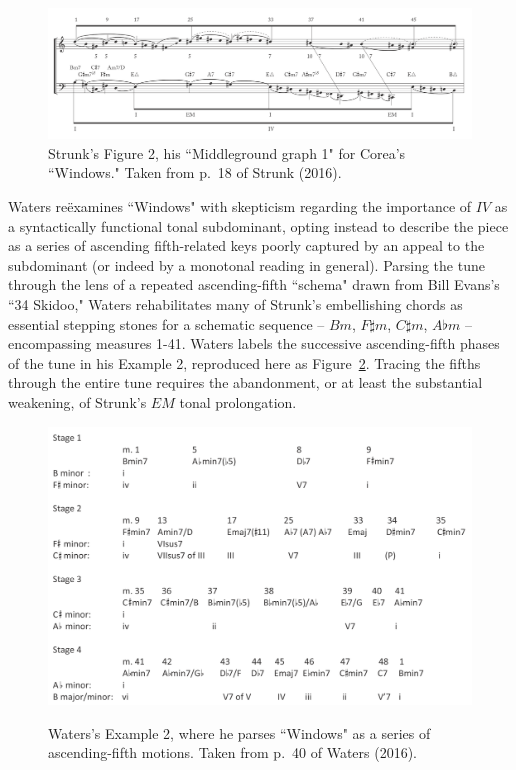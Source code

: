 \begin{figure}
	\centering
	\caption{Strunk's Figure 2, his ``Middleground graph 1" for Corea's ``Windows."  Taken from p.\ 18 of Strunk (2016).}\label{strunk_fig}
	\includegraphics[width=6.4in]{strunk_windows1.png}
\end{figure}

Waters re\"{e}xamines ``Windows" with skepticism regarding the importance of $IV$ as a syntactically functional tonal subdominant, opting instead to describe the piece as a series of ascending fifth-related keys poorly captured by an appeal to the subdominant (or indeed by a monotonal reading in general).  Parsing the tune through the lens of a repeated ascending-fifth ``schema" drawn from Bill Evans's ``34 Skidoo," Waters rehabilitates many of Strunk's embellishing chords as essential stepping stones for a schematic sequence -- $Bm$, $F\sharp m$, $C\sharp m$, $A\flat m$ -- encompassing measures 1-41.  Waters labels the successive ascending-fifth phases of the tune in his Example 2, reproduced here as Figure~\ref{waters_fig}.  Tracing the fifths through the entire tune requires the abandonment, or at least the substantial weakening, of Strunk's $EM$ tonal prolongation.

\begin{figure}
	\centering
	\caption{Waters's Example 2, where he parses ``Windows" as a series of ascending-fifth motions.  Taken from p.\ 40 of Waters (2016).}
	\includegraphics[width=6.4in]{waters_windows.png}
	\label{waters_fig}
\end{figure}

